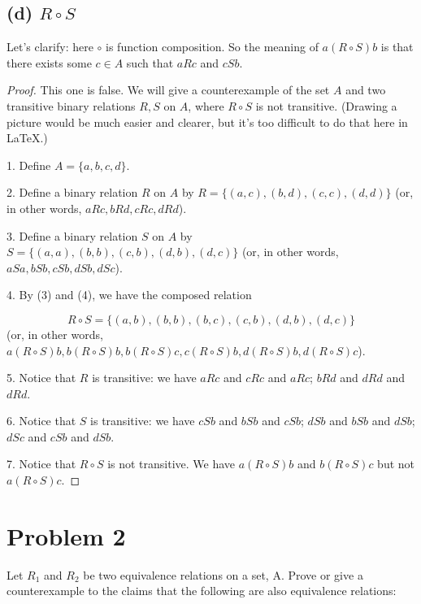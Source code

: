 \documentclass[14pt]{extarticle}
\begin{document}
\subsection{(d) $R \circ S$}
Let's clarify: here $\circ$ is function composition. So the meaning of $a (R \circ S) b$ is that there exists some $c \in A$ such that $a R c$ and $c S b$. 
\begin{proof}
This one is false. We will give a counterexample of the set $A$ and two transitive binary relations $R, S$ on $A$, where $R \circ S$ is not transitive. (Drawing a picture would be much easier and clearer, but it's too difficult to do that here in \LaTeX.)

1. Define $A = \{a,b,c,d\}$.

2. Define a binary relation $R$ on $A$ by $R = \{(a,c), (b,d), (c,c), (d,d)\}$ (or, in other words, $aRc, bRd, cRc, dRd$).

3. Define a binary relation $S$ on $A$ by $S = \{(a,a),(b,b),(c,b),(d,b),(d,c)\}$ (or, in other words, $aSa, bSb, cSb, dSb, dSc$).

4. By (3) and (4), we have the composed relation 

$$
R \circ S = \{(a,b),(b,b),(b,c),(c,b),(d,b),(d,c)\}
$$
(or, in other words, $a(R\circ S)b, b(R\circ S)b, b(R\circ S)c, c(R\circ S)b, d(R\circ S)b, d(R\circ S)c$).

5. Notice that $R$ is transitive: we have $aRc$ and $cRc$ and $aRc$; $bRd$ and $dRd$ and $dRd$.

6. Notice that $S$ is transitive: we have $cSb$ and $bSb$ and $cSb$; $dSb$ and $bSb$ and $dSb$; $dSc$ and $cSb$ and $dSb$.

7. Notice that $R \circ S$ is not transitive. We have $a(R \circ S)b$ and $b(R \circ S)c$ but not $a(R \circ S)c$.
\end{proof}

\section{Problem 2}
Let $R_1$ and $R_2$ be two equivalence relations on a set, A. Prove or give a counterexample to the claims that the following are also equivalence relations:
\end{document}
